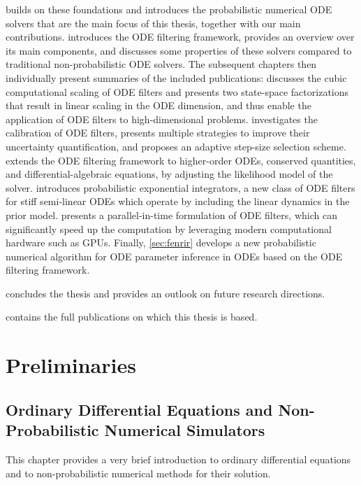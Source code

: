 \documentclass{mimosis}
\begin{document}
 builds on these foundations and introduces the probabilistic numerical ODE solvers that are the main focus of this thesis, together with our main contributions.
 introduces the ODE filtering framework, provides an overview over its main components, and discusses some properties of these solvers compared to traditional non-probabilistic ODE solvers.
The subsequent chapters then individually present summaries of the included publications:
 discusses the cubic computational scaling of ODE filters and presents two state-space factorizations that result in linear scaling in the ODE dimension, and thus enable the application of ODE filters to high-dimensional problems.
 investigates the calibration of ODE filters, presents multiple strategies to improve their uncertainty quantification, and proposes an adaptive step-size selection scheme.
 extends the ODE filtering framework to higher-order ODEs, conserved quantities, and differential-algebraic equations, by adjusting the likelihood model of the solver.
 introduces probabilistic exponential integrators, a new class of ODE filters for stiff semi-linear ODEs which operate by including the linear dynamics in the prior model.
 presents a parallel-in-time formulation of ODE filters, which can significantly speed up the computation by leveraging modern computational hardware such as GPUs.
Finally, \cref{sec:fenrir} develops a new probabilistic numerical algorithm for ODE parameter inference in ODEs based on the ODE filtering framework.

 concludes the thesis and provides an outlook on future research directions.

 contains the full publications on which this thesis is based.
\part{Preliminaries}
\label{part:background}
\chapter{Ordinary Differential Equations and Non-Probabilistic Numerical Simulators}
\label{sec:org1519829}
\label{sec:odes}
This chapter provides a very brief introduction to ordinary differential equations and to non-probabilistic numerical methods for their solution.
\end{document}
